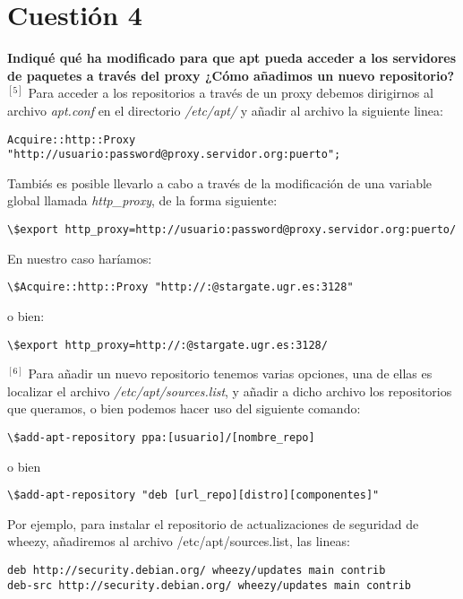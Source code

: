 \documentclass[a4paper, 11pt]{article} %
\begin{document}
\pagebreak

\section{Cuestión 4}
\textbf{Indiqué qué ha modificado para que apt pueda acceder a los servidores de paquetes a través del proxy ¿Cómo añadimos un nuevo repositorio?}\\

$^{[5]}$ Para acceder a los repositorios a través de un proxy debemos dirigirnos al archivo \textit{apt.conf} en el directorio \textit{/etc/apt/} y añadir al archivo la siguiente linea:
\begin{verbatim}
Acquire::http::Proxy "http://usuario:password@proxy.servidor.org:puerto";
\end{verbatim}
Tambiés es posible llevarlo a cabo a través de la modificación de una variable global llamada \textit{http\_proxy}, de la forma siguiente:
\begin{verbatim}
\$export http_proxy=http://usuario:password@proxy.servidor.org:puerto/
\end{verbatim}

En nuestro caso haríamos:
\begin{verbatim}
\$Acquire::http::Proxy "http://:@stargate.ugr.es:3128"
\end{verbatim}
o bien:
\begin{verbatim}
\$export http_proxy=http://:@stargate.ugr.es:3128/
\end{verbatim}


$^{[6]}$ Para añadir un nuevo repositorio tenemos varias opciones, una de ellas es localizar el archivo \textit{/etc/apt/sources.list}, y añadir a dicho archivo los repositorios que queramos, o bien podemos hacer uso del siguiente comando:
\begin{verbatim}
\$add-apt-repository ppa:[usuario]/[nombre_repo]
\end{verbatim}
o bien
\begin{verbatim}
\$add-apt-repository "deb [url_repo][distro][componentes]"
\end{verbatim}

Por ejemplo, para instalar el repositorio de actualizaciones de seguridad de wheezy, añadiremos al archivo /etc/apt/sources.list, las lineas:
\begin{verbatim}
deb http://security.debian.org/ wheezy/updates main contrib
deb-src http://security.debian.org/ wheezy/updates main contrib
\end{verbatim}
\end{document}
